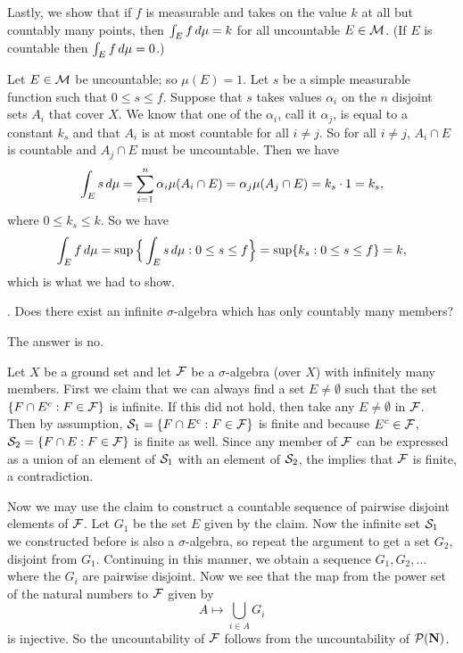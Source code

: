 \noindent Lastly, we show that if $f$ is measurable and takes on the value $k$ at all but countably many points, then $\int_E f\,d\mu = k$ for all uncountable $E\in {\cal M}$. (If $E$ is countable then $\int_E f\,d\mu = 0$.)

\proof Let $E\in {\cal M}$ be uncountable; so $\mu(E) = 1$. Let $s$ be a simple measurable function such that $0\leq s\leq f$. Suppose that $s$ takes values $\alpha_i$ on the $n$ disjoint sets $A_i$ that cover $X$. We know that one of the $\alpha_i$, call it $\alpha_j$, is equal to a constant $k_s$ and that $A_i$ is at most countable for all $i \neq j$. So for all $i \neq j$, $A_i \cap E$ is countable and $A_j \cap E$ must be uncountable. Then we have
$$\int_E s\,d\mu = \sum_{i=1}^n \alpha_i \mu(A_i\cap E) = \alpha_j\mu(A_j\cap E) = k_s\cdot 1 = k_s,$$
where $0\leq k_s \leq k$. So we have
$$\int_E f\,d\mu = \sup \Big\{ \int_E s\,d\mu : 0 \leq s\leq f\Big\} = \sup \{k_s : 0\leq s \leq f\} = k,$$
which is what we had to show.\slug

. Does there exist an infinite $\sigma$-algebra which has only countably many members?

\noindent The answer is no.

\proof Let $X$ be a ground set and let ${\cal F}$ be a $\sigma$-algebra (over $X$) with infinitely many members. First we claim that we can always find a set $E\neq \emptyset$ such that the set $\{ F \cap E^c : F\in {\cal F}\}$ is infinite. If this did not hold, then take any $E\neq \emptyset$ in ${\cal F}$. Then by assumption, ${\cal S}_1 = \{ F \cap E^c : F\in {\cal F}\}$ is finite and because $E^c\in {\cal F}$, ${\cal S}_2 = \{ F \cap E : F\in {\cal F}\}$ is finite as well. Since any member of ${\cal F}$ can be expressed as a union of an element of ${\cal S}_1$ with an element of ${\cal S}_2$, the implies that ${\cal F}$ is finite, a contradiction.

Now we may use the claim to construct a countable sequence of pairwise disjoint elements of ${\cal F}$. Let $G_1$ be the set $E$ given by the claim. Now the infinite set ${\cal S}_1$ we constructed before is also a $\sigma$-algebra, so repeat the argument to get a set $G_2$, disjoint from $G_1$. Continuing in this manner, we obtain a sequence $G_1, G_2,\ldots$ where the $G_i$ are pairwise disjoint. Now we see that the map from the power set of the natural numbers to ${\cal F}$ given by
$$ A \mapsto \bigcup_{i\in A} G_i $$
is injective. So the uncountability of ${\cal F}$ follows from the uncountability of ${\cal P}({\bf N})$.\slug

\bye
